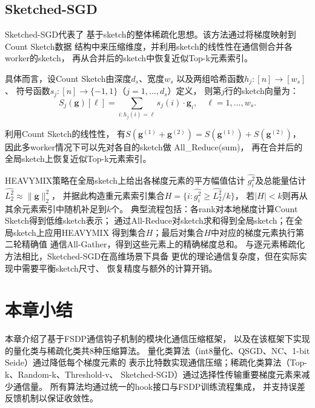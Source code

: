 \subsection{Sketched-SGD}

Sketched-SGD\cite{ivkin2019communication}代表了
基于sketch的整体稀疏化思想。该方法通过将梯度映射到Count Sketch数据
结构中来压缩维度，并利用sketch的线性性在通信侧合并各worker的sketch，
再从合并后的sketch中恢复近似Top-k元素索引。

具体而言，设Count Sketch由深度$d_s$、宽度$w_s$
以及两组哈希函数$h_j: [n] \to [w_s]$、
符号函数$s_j: [n] \to \{-1, 1\}$（$j = 1, \ldots, d_s$）定义，
则第$j$行的sketch向量为：
\begin{equation}
S_j(\mathbf{g})[\ell] = \sum_{i: h_j(i) = \ell} s_j(i) \cdot \mathbf{g}_i, \quad \ell = 1, \ldots, w_s.
\label{eq:sketch}
\end{equation}

利用Count Sketch的线性性，
有$S(\mathbf{g}^{(1)} + \mathbf{g}^{(2)}) = S(\mathbf{g}^{(1)}) + S(\mathbf{g}^{(2)})$，
因此多worker情况下可以先对各自的sketch做 All\_Reduce(sum)，
再在合并后的全局sketch上恢复近似Top-k元素索引。

HEAVYMIX策略在全局sketch上给出各梯度元素的平方幅值估计
$\widehat{g_i^2}$及总能量估计$\widehat{L_2^2} \approx \|\mathbf{g}\|_2^2$，
并据此构造重元素索引集合$H = \{i : \widehat{g_i^2} \ge \widehat{L_2^2} / k\}$，
若$|H| < k$则再从其余元素索引中随机补足到$k$个。
典型流程包括：各rank对本地梯度计算Count Sketch得到低维sketch表示；
通过All-Reduce对sketch求和得到全局sketch；在全局sketch上应用HEAVYMIX
得到集合$H$；最后对集合$H$中对应的梯度元素执行第二轮精确值
通信All-Gather，得到这些元素上的精确梯度总和。
与逐元素稀疏化方法相比，Sketched-SGD在高维场景下具备
更优的理论通信复杂度，但在实际实现中需要平衡sketch尺寸、
恢复精度与额外的计算开销。

\section{本章小结}

本章介绍了基于FSDP通信钩子机制的模块化通信压缩框架，
以及在该框架下实现的量化类与稀疏化类共8种压缩算法。
量化类算法（int8量化、QSGD、NC、1-bit Seide）通过降低每个梯度元素的
表示比特数实现通信压缩；稀疏化类算法（Top-k、Random-k、Threshold-v、
Sketched-SGD）通过选择性传输重要梯度元素来减少通信量。
所有算法均通过统一的hook接口与FSDP训练流程集成，
并支持误差反馈机制以保证收敛性。
